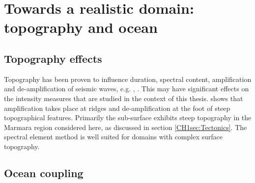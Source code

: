 \documentclass[../Text/00main.tex]{subfiles}
\begin{document}




\section{Towards a realistic domain: topography and ocean}


\subsection{Topography effects}

Topography has been proven to influence duration, spectral content, amplification and de-amplification of seismic waves, e.g. \cite{veeraraghavan_simulation_2020}, \cite{pienkowska2020high}. This may have significant effects on the intensity measures that are studied in the context of this thesis. \cite{veeraraghavan_simulation_2020} shows that amplification takes place at ridges and de-amplification at the foot of steep topographical features. Primarily the sub-surface exhibits steep topography in the Marmara region considered here, as discussed in section \ref{CH1sec:Tectonics}. The spectral element method is well suited for domains with complex surface topography. 



\subsection{Ocean coupling}
\end{document}

